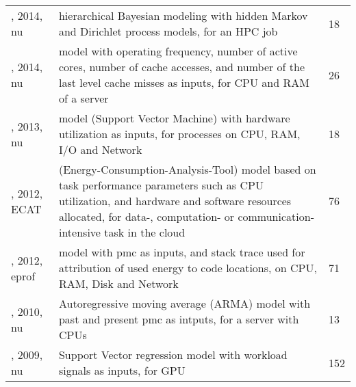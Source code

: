 \begin{longtable}{|>{\raggedright\arraybackslash}p{2.75cm}|p{11.75cm}|p{0.7cm}|}
\cite{storlie2014}, 2014, \acrshort{nu} & hierarchical Bayesian modeling with hidden Markov and Dirichlet process models, for an HPC job & 18 \\
\cite{kim2014}, 2014, \acrshort{nu} & model with operating frequency, number of active cores, number of cache accesses, and number of the last level cache misses as inputs, for CPU and RAM of a server & 26 \\
\cite{singh2013}, 2013, \acrshort{nu} & model (Support Vector Machine) with hardware utilization as inputs, for processes on CPU, RAM, I/O and Network & 18 \\
\cite{chen2012}, 2012, ECAT &  (Energy-Consumption-Analysis-Tool) model based on task performance parameters such as CPU utilization, and hardware and software resources allocated, for data-, computation- or communication-intensive task in the cloud & 76 \\
\cite{schubert2012}, 2012, eprof & model with \acrshort{pmc} as inputs, and stack trace used for attribution of used energy to code locations, on CPU, RAM, Disk and Network & 71 \\
\cite{zamani2010}, 2010, \acrshort{nu} & Autoregressive moving average (ARMA) model with past and present \acrshort{pmc} as intputs, for a server with CPUs & 13 \\
\cite{ma2009}, 2009, \acrshort{nu} & Support Vector regression model with workload signals as inputs, for GPU & 152 \\
\bottomrule
\end{longtable}
